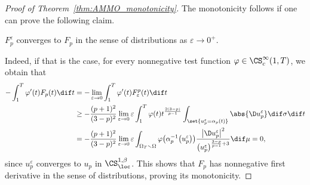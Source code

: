 \begin{proof}[Proof of Theorem~\ref{thm:AMMO_monotonicity}]
The monotonicity follows if one can prove the following claim.
\begin{Claim}
$F_p^\varepsilon$ converges to $F_p$ in the sense of distributions as $\varepsilon\to 0^+$.
\end{Claim}
Indeed, if that is the case, for every nonnegative test function $\varphi \in \CS^\infty_c(1,T)$, we obtain that
\begin{align*}
 -\int_1^T \varphi'(t) F_p(t)\dif t & =-\lim_{\varepsilon\to 0} \int_1^T\varphi'(t) F^p_\varepsilon(t)\dif t \\
 & \geq - \frac{(p+1)^2}{(3-p)^2} \lim_{\varepsilon \to 0} \varepsilon \int_1^T \varphi(t) t^{\frac{2(3-p)}{p-1}} \int_{\set{u^\varepsilon_p=\alpha_p(t)}} \abs{ \D u^\varepsilon_p} \dif \sigma\dif t \\
 & =-\frac{(p+1)^2}{(3-p)^2} \lim_{\varepsilon \to 0} \varepsilon \int_{\Omega_T \smallsetminus \Omega} \varphi \big(\alpha_p^{-1}\big(u^\varepsilon_p\big)\big) \frac{ \big| \D u^\varepsilon_p \big|^2}{\big(u^\varepsilon_p\big)^{\frac{3-p}{p-1}+3}} \dif \mu=0,
\end{align*}
since $u_p^\varepsilon$ converges to $u_p$ in $\CS^{1,\beta}_{\loc}$. This shows that $F_p$ has nonnegative first derivative in the sense of distributions, proving its monotonicity.


\end{proof}
